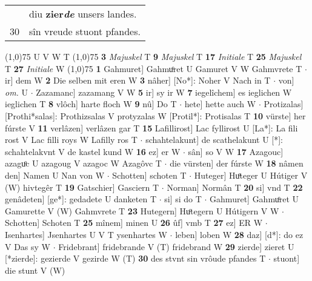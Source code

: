 \documentclass[8pt,a4paper,notitlepage]{article}
\begin{document}
\begin{table}[ht]
\begin{minipage}[t]{0.5\linewidth}
\begin{tabular}{rl}
 & diu \textbf{zier\textit{de}} unsers landes.\\ 
30 & sîn vreude stuont pfandes.\\ 
\end{tabular}
\scriptsize
\line(1,0){75} \newline
U V W T \newline
\line(1,0){75} \newline
\textbf{3} \textit{Majuskel} T  \textbf{9} \textit{Majuskel} T  \textbf{17} \textit{Initiale} T  \textbf{25} \textit{Majuskel} T  \textbf{27} \textit{Initiale} W  \newline
\line(1,0){75} \newline
\textbf{1} Gahmuret] Gahmuͦret U Gamuret V W Gahmvrete T  $\cdot$ ir] dem W \textbf{2} Die selben mit eren W \textbf{3} nâher] [No*]: Noher V Nach in T  $\cdot$ von] \textit{om.} U  $\cdot$ Zazamanc] zazamang V W \textbf{5} ir] sy ir W \textbf{7} iegelîchem] es ieglichen W ieglichen T \textbf{8} vlôch] harte floch W \textbf{9} nû] Do T  $\cdot$ hete] hette auch W  $\cdot$ Protizalas] [Prothi*salas]: Prothizsalas V protyzalas W [Protil*]: Protisalas T \textbf{10} vürste] her fúrste V \textbf{11} verlâzen] verlâzen gar T \textbf{15} Lafillirost] Lac fyllirost U [La*]: La fili rost V Lac filli roys W Lafilly ros T  $\cdot$ schahtelakunt] de scathelakunt U [*]: schahtelakvnt V de kastel kund W \textbf{16} ez] er W  $\cdot$ sân] so V W \textbf{17} Azagouc] azaguͦc U azagoug V azagoc W Azagôvc T  $\cdot$ die vürsten] der fúrste W \textbf{18} nâmen den] Namen U Nan von W  $\cdot$ Schotten] schoten T  $\cdot$ Huteger] Huͦteger U Hútiger V (W) hivtegêr T \textbf{19} Gatschier] Gasciern T  $\cdot$ Norman] Normân T \textbf{20} si] vnd T \textbf{22} genâdeten] [ge*]: gedadete U danketen T  $\cdot$ si] si do T  $\cdot$ Gahmuret] Gahmuͦret U Gamurette V (W) Gahmvrete T \textbf{23} Hutegern] Huͦtegern U Hútigern V W  $\cdot$ Schotten] Schoten T \textbf{25} mînem] minen U \textbf{26} ûf] vmb T \textbf{27} ez] ER W  $\cdot$ Isenhartes] Jsenhartes U V T ysenhartes W  $\cdot$ leben] loben W \textbf{28} daz] [d*]: do ez V Das sy W  $\cdot$ Fridebrant] fridebrande V (T) fridebrand W \textbf{29} zierde] zieret U [*zierde]: gezierde V gezirde W (T) \textbf{30} des stvnt sin vrôude pfandes T  $\cdot$ stuont] die stunt V (W) \newline
\end{minipage}
\end{table}
\end{document}
